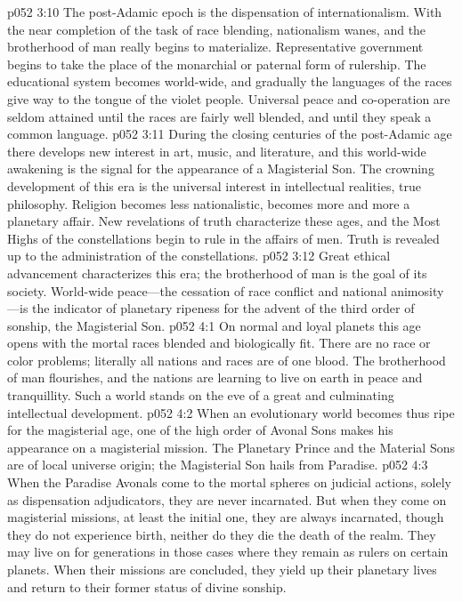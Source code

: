 \pc \vs p052 3:10 The post\hyp{}Adamic epoch is the dispensation of internationalism. With the near completion of the task of race blending, nationalism wanes, and the brotherhood of man really begins to materialize. Representative government begins to take the place of the monarchial or paternal form of rulership. The educational system becomes world\hyp{}wide, and gradually the languages of the races give way to the tongue of the violet people. Universal peace and co\hyp{}operation are seldom attained until the races are fairly well blended, and until they speak a common language.
\vs p052 3:11 During the closing centuries of the post\hyp{}Adamic age there develops new interest in art, music, and literature, and this world\hyp{}wide awakening is the signal for the appearance of a Magisterial Son. The crowning development of this era is the universal interest in intellectual realities, true philosophy. Religion becomes less nationalistic, becomes more and more a planetary affair. New revelations of truth characterize these ages, and the Most Highs of the constellations begin to rule in the affairs of men. Truth is revealed up to the administration of the constellations.
\vs p052 3:12 Great ethical advancement characterizes this era; the brotherhood of man is the goal of its society. World\hyp{}wide peace---the cessation of race conflict and national animosity---is the indicator of planetary ripeness for the advent of the third order of sonship, the Magisterial Son.
\vs p052 4:1 On normal and loyal planets this age opens with the mortal races blended and biologically fit. There are no race or color problems; literally all nations and races are of one blood. The brotherhood of man flourishes, and the nations are learning to live on earth in peace and tranquillity. Such a world stands on the eve of a great and culminating intellectual development.\plusone
\pc \vs p052 4:2 When an evolutionary world becomes thus ripe for the magisterial age, one of the high order of Avonal Sons makes his appearance on a magisterial mission. The Planetary Prince and the Material Sons are of local universe origin; the Magisterial Son hails from Paradise.
\vs p052 4:3 When the Paradise Avonals come to the mortal spheres on judicial actions, solely as dispensation adjudicators, they are never incarnated. But when they come on magisterial missions, at least the initial one, they are always incarnated, though they do not experience birth, neither do they die the death of the realm. They may live on for generations in those cases where they remain as rulers on certain planets. When their missions are concluded, they yield up their planetary lives and return to their former status of divine sonship.
